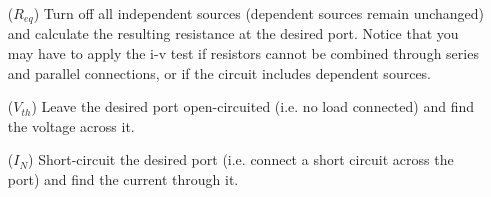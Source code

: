 \documentclass[twocolumn]{article}
\begin{document}
\begin{itemize}
    \item[($R_{eq}$)] Turn off all independent sources (dependent
    sources remain unchanged) and calculate the resulting resistance at the
    desired port. Notice that you may have to apply the i-v test if resistors
    cannot be combined through series and parallel connections, or if the
    circuit includes dependent sources.
    \item[($V_{th}$)] Leave the desired port open-circuited
    (i.e. no load connected) and find the voltage across it.
    \item[($I_N$)] Short-circuit the desired port (i.e. connect
    a short circuit across the port) and find the current through it. 
\end{itemize}
\end{document}
